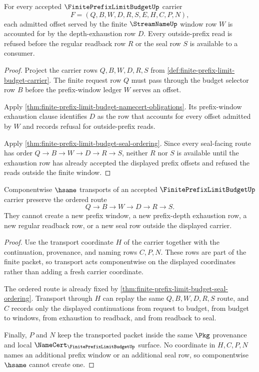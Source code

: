 \begin{theorem}
\label{thm:finite-prefix-limit-budget-prefix-exhaustion-coverage}
For every accepted $\FinitePrefixLimitBudgetUp$ carrier
$$
F=(Q,B,W,D,R,S,E,H,C,P,N),
$$
each admitted offset served by the finite $\StreamNameUp$ window row $W$ is accounted for by the depth-exhaustion row $D$. Every outside-prefix read is refused before the regular readback row $R$ or the seal row $S$ is available to a consumer.
\end{theorem}
\begin{proof}
Project the carrier rows $Q,B,W,D,R,S$ from \autoref{def:finite-prefix-limit-budget-carrier}. The finite request row $Q$ must pass through the budget selector row $B$ before the prefix-window ledger $W$ serves an offset.

Apply \autoref{thm:finite-prefix-limit-budget-namecert-obligations}. Its prefix-window exhaustion clause identifies $D$ as the row that accounts for every offset admitted by $W$ and records refusal for outside-prefix reads.

Apply \autoref{thm:finite-prefix-limit-budget-seal-ordering}. Since every seal-facing route has order $Q \to B \to W \to D \to R \to S$, neither $R$ nor $S$ is available until the exhaustion row has already accepted the displayed prefix offsets and refused the reads outside the finite window.
\end{proof}

\begin{theorem}
\label{thm:finite-prefix-limit-budget-hsame-transport}
Componentwise $\hsame$ transports of an accepted $\FinitePrefixLimitBudgetUp$ carrier preserve the ordered route
$$
Q \to B \to W \to D \to R \to S.
$$
They cannot create a new prefix window, a new prefix-depth exhaustion row, a new regular readback row, or a new seal row outside the displayed carrier.
\end{theorem}
\begin{proof}
Use the transport coordinate $H$ of the carrier together with the continuation, provenance, and naming rows $C,P,N$. These rows are part of the finite packet, so transport acts componentwise on the displayed coordinates rather than adding a fresh carrier coordinate.

The ordered route is already fixed by \autoref{thm:finite-prefix-limit-budget-seal-ordering}. Transport through $H$ can replay the same $Q,B,W,D,R,S$ route, and $C$ records only the displayed continuations from request to budget, from budget to windows, from exhaustion to readback, and from readback to seal.

Finally, $P$ and $N$ keep the transported packet inside the same $\Pkg$ provenance and local $\NameCert_{\FinitePrefixLimitBudgetUp}$ surface. No coordinate in $H,C,P,N$ names an additional prefix window or an additional seal row, so componentwise $\hsame$ cannot create one.
\end{proof}

